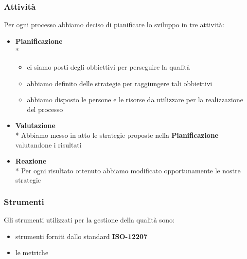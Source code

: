 \subsubsection{Attività}
Per ogni processo abbiamo deciso di pianificare lo sviluppo in tre attività:
\begin{itemize}
	\item \textbf{Pianificazione} \\*
		\begin{itemize}
			\item ci siamo posti degli obbiettivi per perseguire la qualità
			\item abbiamo definito delle strategie per raggiungere tali obbiettivi
			\item abbiamo disposto le persone e le risorse da utilizzare per la realizzazione del processo
		\end{itemize}
	\item \textbf{Valutazione} \\*
		Abbiamo messo in atto le strategie proposte nella \textbf{Pianificazione} valutandone i risultati
	\item \textbf{Reazione} \\*
		Per ogni risultato ottenuto abbiamo modificato opportunamente le nostre strategie
\end{itemize}
\subsubsection{Strumenti}
Gli strumenti utilizzati per la gestione della qualità sono:
\begin{itemize}
	\item strumenti forniti dallo standard \textbf{ISO-12207}
	\item le metriche
\end{itemize}
